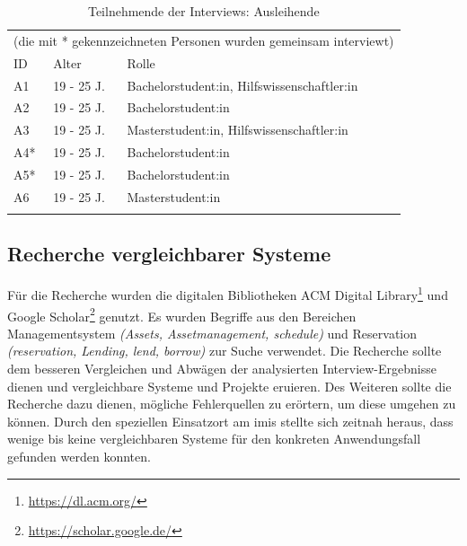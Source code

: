 \begin{table}[h]
        \centering
        \caption{Teilnehmende der Interviews: Ausleihende }
        \begin{tabular}{lll}
                \multicolumn{3}{c}{(die mit * gekennzeichneten Personen wurden gemeinsam
                interviewt) }                                                    \\
                \arrayrulecolor{maincolor}\hline
                \sffamily\color{maincolor}ID & \sffamily\color{maincolor}Alter &
                \sffamily\color{maincolor}Rolle
                \\
                \arrayrulecolor{maincolor}\hline
                A1                           & 19 - 25 J.                      &
                Bachelorstudent:in, Hilfswissenschaftler:in
                \\
                A2                           & 19 - 25 J.                      &
                Bachelorstudent:in                                               \\
                A3                           & 19 - 25 J.                      &
                Masterstudent:in, Hilfswissenschaftler:in
                \\
                A4*                          & 19 - 25 J.                      &
                Bachelorstudent:in                                               \\
                A5*                          & 19 - 25 J.                      &
                Bachelorstudent:in                                               \\
                A6                           & 19 - 25 J.                      &
                Masterstudent:in                                                 \\
                \arrayrulecolor{maincolor}\hline
        \end{tabular}
        \label{table:a}
\end{table}

\subsection{Recherche vergleichbarer Systeme}
\label{subsection:system}
Für die Recherche wurden die digitalen Bibliotheken ACM Digital
Library\footnote{\url{https://dl.acm.org/}} und Google
Scholar\footnote{\url{https://scholar.google.de/}} genutzt. Es wurden Begriffe
aus den Bereichen Managementsystem \textit{(Assets, Assetmanagement, schedule)}
und Reservation \textit{(reservation, Lending, lend, borrow)} zur Suche
verwendet. Die Recherche sollte dem besseren Vergleichen und Abwägen der
analysierten Interview-Ergebnisse dienen und vergleichbare Systeme und Projekte
eruieren. Des Weiteren sollte die Recherche dazu dienen, mögliche Fehlerquellen
zu erörtern, um diese umgehen zu können. Durch den speziellen Einsatzort am
\ac{imis} stellte sich zeitnah heraus, dass wenige bis keine vergleichbaren
Systeme für den konkreten Anwendungsfall gefunden werden konnten.

